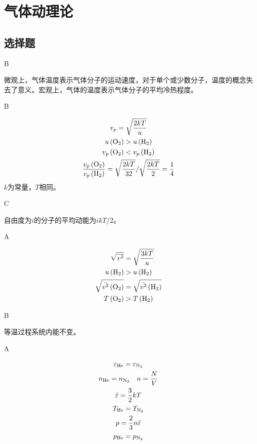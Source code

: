 \chapter{气体动理论}
\section{选择题}
\exercise B

\solve 微观上，气体温度表示气体分子的运动速度，对于单个或少数分子，温度的概念失去了意义。宏观上，气体的温度表示气体分子的平均冷热程度。

\exercise B

\solve
\begin{gather*} 
{v_p=\sqrt{\frac{2kT}{u}}}\\
{u\left(\ce{O2}\right)}>u\left(\ce{H2}\right)\\
{v_p\left(\ce{O2}\right)<v_p\left(\ce{H2}\right) } \\
\frac{v_p\left(\ce{O2}\right)}{v_p\left(\ce{H2}\right)}=\sqrt{\frac{2kT}{32}}{\displaystyle\Huge/} \sqrt{\frac{2kT}{2}}=\frac{1}{4}%
\end{gather*}
$k$为常量，$T$相同。

\exercise C

\solve 自由度为$i$的分子的平均动能为$ikT/2$。

\exercise A

\solve

$$
\begin{aligned} 
\sqrt {\overline{v^{2}}} &=\sqrt{\frac{3kT}{u}} \\
u\left(\ce{H2}\right)& > u\left(\ce{H2}\right) \\
\sqrt {\bar{v^2}\left(\ce{O2}\right)}& = \sqrt {\bar{v^2}\left(\ce{H2}\right) }\\
T\left(\ce{O2}\right)&>T\left(\ce{H2}\right) 
\end{aligned}
$$

\exercise B

\solve 等温过程系统内能不变。

\exercise A

\solve

\begin{gather*}
\varepsilon_{\ce{He}}=\varepsilon_{\ce{N2}}\\
n_{\ce{He}}=n_{\ce{N2}}\quad n=\frac{N}{V}\\
\bar{\varepsilon}=\frac{3}{2}kT\\
T_{\ce{He}}=T_{\ce{N2}}\\
p=\frac{2}{3}n\bar{\varepsilon}\\
p_{\ce{He}}=p_{\ce{N2}}
\end{gather*}

